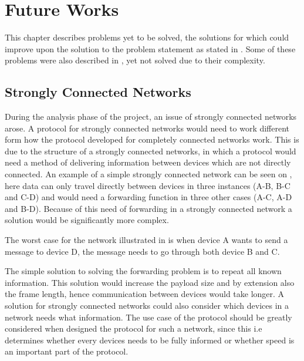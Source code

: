 \chapter{Future Works}
This chapter describes problems yet to be solved, the solutions for which could improve upon the solution to the problem statement as stated in . 
Some of these problems were also described in , yet not solved due to their complexity.

\section{Strongly Connected Networks}
During the analysis phase of the project, an issue of strongly connected networks arose.
A protocol for strongly connected networks would need to work different form how the protocol developed for completely connected networks work.
This is due to the structure of a strongly connected networks, in which a protocol would need a method of delivering information between devices which are not directly connected.
An example of a simple strongly connected network can be seen on , here data can only travel directly between devices in three instances  (A-B, B-C and C-D) and would need a forwarding function in three other cases (A-C, A-D and B-D). 
Because of this need of forwarding in a strongly connected network a solution would be significantly more complex.

\noindent
The worst case for the network illustrated in  is when device A wants to send a message to device D, the message needs to go through both device B and C.

The simple solution to solving the forwarding problem is to repeat all known information.
This solution would increase the payload size and by extension also the frame length, hence communication between devices would take longer.
A solution for strongly connected networks could also consider which devices in a network needs what information.
The use case of the protocol should be greatly considered when designed the protocol for such a network, since this i.e determines whether every devices needs to be fully informed or whether speed is an important part of the protocol.

